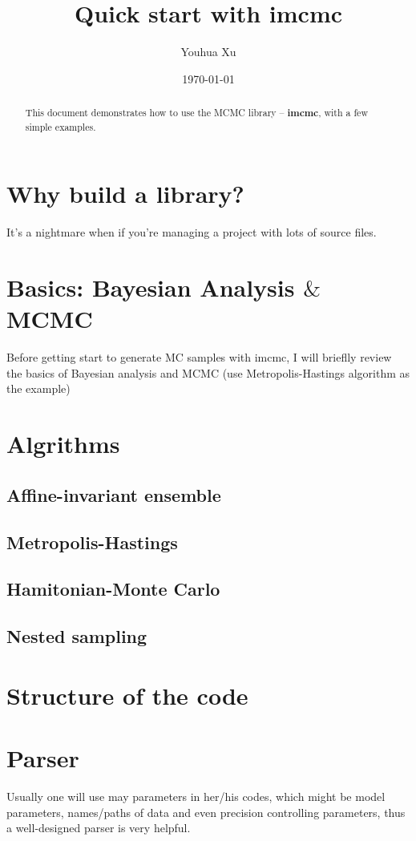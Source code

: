 \documentclass[ a4paper,
                10pt, 
		onecolumn,
                aps,
                amsfonts,
                amssymb,
                amsmath,
                eqsecnum,
                nofootinbib,  %
                superscriptaddress]{revtex4}
\begin{document}
\title{Quick start with imcmc}

\author{Youhua Xu}

\date{\today}


\begin{abstract}
This document demonstrates how to use the MCMC library -- \textbf{imcmc}, with a few simple
examples.
\end{abstract}

\maketitle

\section{Why build a library?}
It's a nightmare when if you're managing a project with lots of source files.

\section{Basics: Bayesian Analysis $\&$ MCMC}
Before getting start to generate MC samples with imcmc, I will brieflly
review the basics of Bayesian analysis and MCMC (use Metropolis-Hastings
algorithm as the example)


\section{Algrithms}

\subsection{Affine-invariant ensemble}


\subsection{Metropolis-Hastings}


\subsection{Hamitonian-Monte Carlo}


\subsection{Nested sampling}

\section{Structure of the code}


\appendix
\section{Parser}
Usually one will use may parameters in her/his codes, which might be model parameters, names/paths of data and even precision
controlling parameters, thus a well-designed parser is very helpful.
\end{document}

